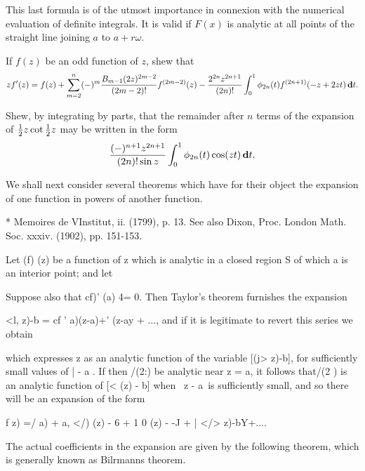 This last formula is of the utmost importance in connexion with the
numerical evaluation of definite integrals. It is valid if $F(x)$ is
analytic at all points of the straight line joining 
$a$ to $a + r \omega$.

\begin{wandwexample}
  If $f(z)$ be an odd function of $z$, shew that
  $$
  z f'(z)
  =
  f(z)
  +
  \sum_{m=2}^{n}
  (-)^{m}
  \frac{B_{m-1} (2z)^{2m-2}}{(2m-2)!}
  f^{(2m-2)}(z)
  -
  \frac{2^{2n} z^{2n+1}}{(2n)!}
  \int_{0}^{1}
  \phi_{2n}(t)
  f^{(2n+1)}(-z + 2zt)
  \, \mathbf{d} t.
  $$
\end{wandwexample}
\begin{wandwexample}
  Shew, by integrating by parts, that the remainder after $n$
  terms of the expansion of $\frac{1}{2} z \cot \frac{1}{2} z$ may be written in the form
  $$
  \frac{ (-)^{n+1} z^{2n+1} }{ (2n)! \sin z }
  \int_{0}^{1} \phi_{2n}(t) \cos (zt) \, \mathbf{d} t.
  $$
\end{wandwexample}

We shall next consider several theorems which have for their object
the expansion of one function in powers of another function.

* Memoires de VInstitut, ii. (1799), p. 13. See also Dixon, Proc.
London Math. Soc. xxxiv. (1902), pp. 151-153.

%
%

Let (f) (z) be a function of z which is analytic in a closed region S
of which a is an interior point; and let

Suppose also that cf)' (a) 4= 0. Then Taylor's theorem furnishes the
expansion

<l, z)-b = cf ' a)(z-a)+' (z-ay + ..., and if it is legitimate to
revert this series we obtain

which expresses z as an analytic function of the variable [(j> z)-b],
for sufficiently small values of | - a . If then /(2:) be analytic
near z = a, it follows that/(2 ) is an analytic function of [< (z) -
b] when \ z - a\ is sufficiently small, and so there will be an
expansion of the form

f z) =/ a) + a, </) (z) - 6 + 1 0 (z) - -J + | </> z)-bY+....

The actual coefficients in the expansion are given by the following
theorem, which is generally known as Bilrmanns theorem.

